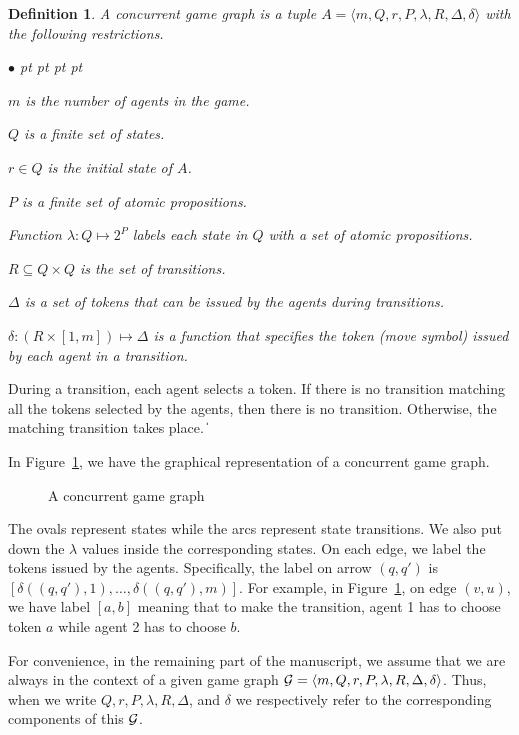 \documentclass[11pt]{article}
\newtheorem{definition}{Definition}
\newcommand{\calg}{{\cal G}}
\def\qed{\ifmmode\|\else{\unskip\nobreak\hfil
\penalty50\hskip1em\null\nobreak\hfil$\blacksquare$
\parfillskip=0pt\finalhyphendemerits=0\endgraf}\fi}
\newenvironment{list1}{\begin{list}{$\bullet$}
{\topsep 0 pt \parsep 0 pt \partopsep 0 pt \itemsep 0 pt}}{\end{list}}
\begin{document}
\begin{definition}
A concurrent game graph is a tuple 
$A=\langle m,Q,r,P,\lambda,R,\Delta,\delta\rangle$
with the following restrictions.
\begin{list1}
\item 
	$m$ is the number of agents in the game.
\item 
	$Q$ is a finite set of states.
\item 
	$r\in Q$ is the {\em initial state} of $A$.
\item 
	$P$ is a finite set of atomic propositions.
\item Function 
	$\lambda:Q\mapsto 2^P$ labels each 
	state in $Q$ with a set of atomic propositions.
\item 
	$R\subseteq Q\times Q$ is the set of transitions.
\item 
	$\Delta$ is a set of tokens that can be issued 
	by the agents during transitions.  
\item 
	$\delta:(R\times [1,m])\mapsto \Delta$ is a function that specifies the
    token (move symbol) issued by each agent in a transition.
\end{list1}
\end{definition} 
During a transition, each agent selects a token.  
If there is no transition matching all the tokens selected by the agents, 
then there is no transition.  
Otherwise, the matching transition takes place.  
\qed 


In Figure~\ref{fig.cg}, we have the graphical representation of a concurrent game graph.  
\begin{figure}[!ht]
\begin{center}
\end{center}
\caption{A concurrent game graph}
\label{fig.cg}
\end{figure} 
The ovals represent states while the arcs represent 
state transitions.  
We also put down the $\lambda$ values inside the corresponding states. 
On each edge, we label the tokens issued by the agents. 
Specifically, the label on arrow $(q,q')$ is 
$[\delta((q,q'),1),\ldots,\delta((q,q'),m)]$.  
For example, in Figure~\ref{fig.cg}, 
on edge $(v,u)$, we have label $[a,b]$ meaning that 
to make the transition, agent 1 has to choose token $a$ while 
agent 2 has to choose $b$.  




For convenience, in the remaining part of the 
manuscript, we assume that we are always in the context 
of a given game graph
$\calg=\langle m,Q,r,P,\lambda,R,\Delta,\delta\rangle$.
Thus, when we write $Q,r,P,\lambda,R,\Delta$, and $\delta$ 
we respectively refer to the corresponding components of this $\calg$.  
\end{document}

